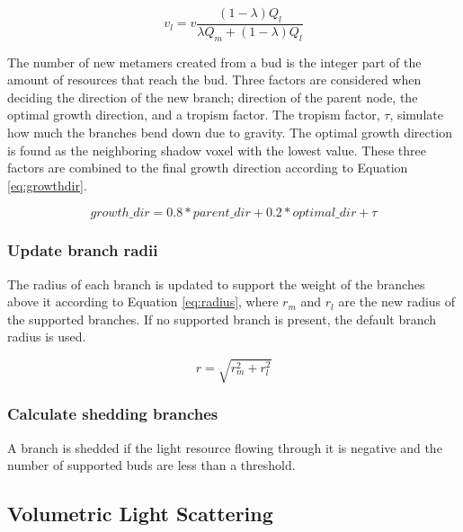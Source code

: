 \documentclass{article}
\begin{document}
	  			\begin{equation}
	  				\label{eq:vl}
	  				v_l = v\frac{(1 - \lambda) Q_l}{\lambda Q_m + (1 - \lambda)Q_l}
	  			\end{equation}
	  			
	  			The number of new metamers created from a bud is the integer part of the amount of resources that reach the bud. Three factors are considered when deciding the direction of the new branch; direction of the parent node, the optimal growth direction, and a tropism factor. The tropism factor, $\tau$, simulate how much the branches bend down due to gravity. The optimal growth direction  is found as the neighboring shadow voxel with the lowest value. These three factors are combined to the final growth direction according to Equation \ref{eq:growthdir}. \citep{palubicki2009self}
	  			
	  			\begin{equation}
	  				\label{eq:growthdir}
	  				growth\_dir = 0.8 * parent\_dir + 0.2 * optimal\_dir + \tau
	  			\end{equation}
	  			
	  		\subsubsection*{Update branch radii}
	  			
	  			The radius of each branch is updated to support the weight of the branches above it according to Equation \ref{eq:radius}, where $r_m$ and $r_l$ are the new radius of the supported branches. If no supported branch is present, the default branch radius is used. \citep{mvech1996visual}
	  			
	  			\begin{equation}
	  				\label{eq:radius}
	  				r = \sqrt{r_m^2 + r_l^2}
	  			\end{equation}
	  			
	  		\subsubsection*{Calculate shedding branches}
	  			
	  			A branch is shedded if the light resource flowing through it is negative and the number of supported buds are less than a threshold.
	  			\citep{mvech1996visual}
  			
  		\subsection{Volumetric Light Scattering}
  		
\end{document}
